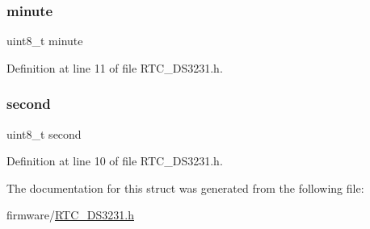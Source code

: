\hypertarget{structrtc__time__t_a8ff981ec55c945940f4a0da7d8709b3c}{}\label{structrtc__time__t_a8ff981ec55c945940f4a0da7d8709b3c} 
\subsubsection{\texorpdfstring{minute}{minute}}
{\footnotesize\ttfamily uint8\+\_\+t minute}



Definition at line 11 of file R\+T\+C\+\_\+\+D\+S3231.\+h.

\hypertarget{structrtc__time__t_a8459fc4e94de7eefc74991e41779c8fc}{}\label{structrtc__time__t_a8459fc4e94de7eefc74991e41779c8fc} 
\subsubsection{\texorpdfstring{second}{second}}
{\footnotesize\ttfamily uint8\+\_\+t second}



Definition at line 10 of file R\+T\+C\+\_\+\+D\+S3231.\+h.



The documentation for this struct was generated from the following file\+:\begin{DoxyCompactItemize}
\item 
firmware/\hyperlink{_r_t_c___d_s3231_8h}{R\+T\+C\+\_\+\+D\+S3231.\+h}\end{DoxyCompactItemize}
